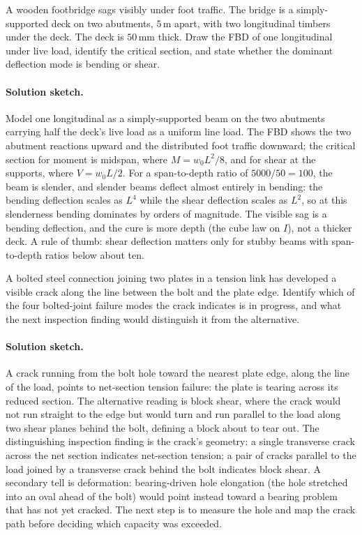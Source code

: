 \begin{exercise}
A wooden footbridge sags visibly under foot traffic. The bridge is
a simply-supported deck on two abutments, $5\,\si{\meter}$ apart,
with two longitudinal timbers under the deck. The deck is $50\,\si{
\milli\meter}$ thick. Draw the FBD of one longitudinal under live
load, identify the critical section, and state whether the dominant
deflection mode is bending or shear.

\paragraph{Solution sketch.} Model one longitudinal as a
simply-supported beam on the two abutments carrying half the deck's live
load as a uniform line load. The FBD shows the two abutment reactions
upward and the distributed foot traffic downward; the critical section
for moment is midspan, where $M = w_0 L^2/8$, and for shear at the
supports, where $V = w_0 L/2$. For a span-to-depth ratio of
$5000/50 = 100$, the beam is slender, and slender beams deflect almost
entirely in bending: the bending deflection scales as $L^4$ while the
shear deflection scales as $L^2$, so at this slenderness bending
dominates by orders of magnitude. The visible sag is a bending
deflection, and the cure is more depth (the cube law on $I$), not a
thicker deck. A rule of thumb: shear deflection matters only for stubby
beams with span-to-depth ratios below about ten.
\end{exercise}

\begin{exercise}
A bolted steel connection joining two plates in a tension link has
developed a visible crack along the line between the bolt and the
plate edge. Identify which of the four bolted-joint failure modes
the crack indicates is in progress, and what the next inspection
finding would distinguish it from the alternative.

\paragraph{Solution sketch.} A crack running from the bolt hole toward
the nearest plate edge, along the line of the load, points to
net-section tension failure: the plate is tearing across its reduced
section. The alternative reading is block shear, where the crack would
not run straight to the edge but would turn and run parallel to the load
along two shear planes behind the bolt, defining a block about to tear
out. The distinguishing inspection finding is the crack's geometry: a
single transverse crack across the net section indicates net-section
tension; a pair of cracks parallel to the load joined by a transverse
crack behind the bolt indicates block shear. A secondary tell is
deformation: bearing-driven hole elongation (the hole stretched into an
oval ahead of the bolt) would point instead toward a bearing problem
that has not yet cracked. The next step is to measure the hole and map
the crack path before deciding which capacity was exceeded.
\end{exercise}

